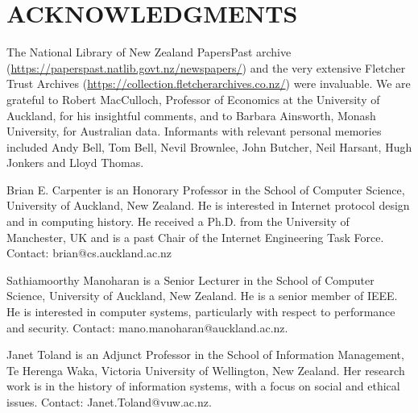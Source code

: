 \documentclass{IEEEcsmag}
\begin{document}
\section{ACKNOWLEDGMENTS}
The National Library of New Zealand PapersPast archive
(\href{https://paperspast.natlib.govt.nz/newspapers}{https://paperspast.natlib.govt.nz/newspapers/})
and the very extensive Fletcher Trust Archives
(\href{https://collection.fletcherarchives.co.nz/}{https://collection.fletcherarchives.co.nz/}) were invaluable.
We are grateful to Robert MacCulloch, Professor of Economics at the University of Auckland, for his
insightful comments, 
\cbstart
and to Barbara Ainsworth, Monash University, for Australian data.
Informants with relevant
personal memories included Andy Bell, Tom Bell, Nevil Brownlee,
John Butcher, Neil Harsant, Hugh
Jonkers and Lloyd Thomas.
\cbend




\begin{IEEEbiography}{Brian E. Carpenter} is an Honorary Professor in the School of Computer Science, University of Auckland, New Zealand. He is interested in Internet protocol design and in computing history. He received a Ph.D. from the University of Manchester, UK and is a past Chair of the Internet Engineering Task Force. Contact: brian@cs.auckland.ac.nz\vspace*{8pt}
\end{IEEEbiography}

\begin{IEEEbiography}{Sathiamoorthy Manoharan} is a Senior Lecturer in the School of Computer Science, University of Auckland, New Zealand.
He is a senior member of IEEE. He is interested in computer systems, particularly with respect to performance and security. Contact: mano.manoharan@auckland.ac.nz.\vspace*{8pt}
\end{IEEEbiography}

\begin{IEEEbiography}{Janet Toland} is an Adjunct Professor in the School of Information Management,
Te Herenga Waka, Victoria University of Wellington, New Zealand. Her research work is in the history of
information systems, with a focus on social and ethical issues. Contact: Janet.Toland@vuw.ac.nz.\vspace*{8pt}
\end{IEEEbiography}
\end{document}
